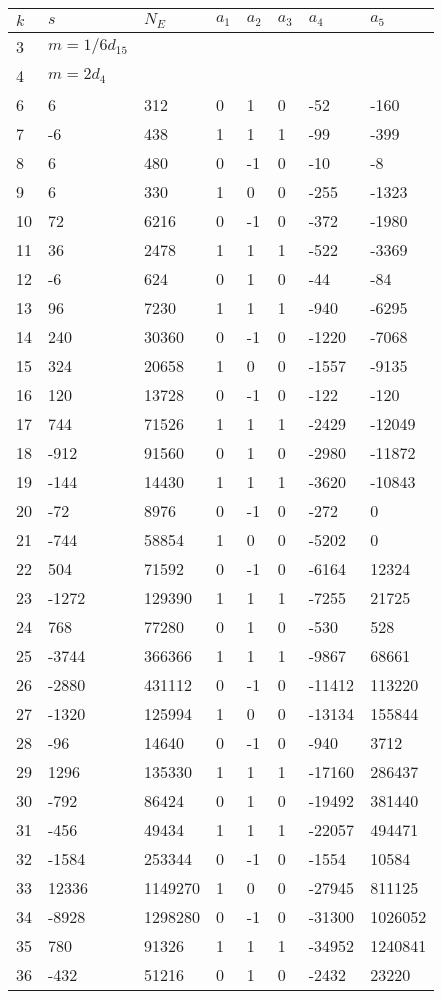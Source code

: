 \documentclass{amsart}
\begin{document}
\begin{longtable}{|l|l|l|lllll|}
\hline
$k$ & $s$ & $N_E$ & $a_1$ & $a_2$ & $a_3$ & $a_4$ & $a_5$\\
\hline
3&$m=1/6d_{15}$&&\multicolumn{5}{c|}{}\\
4&$m=2d_{4}$&&\multicolumn{5}{c|}{}\\
6&6&312&0&1&0&-52&-160\\
7&-6&438&1&1&1&-99&-399\\
8&6&480&0&-1&0&-10&-8\\
9&6&330&1&0&0&-255&-1323\\
10&72&6216&0&-1&0&-372&-1980\\
11&36&2478&1&1&1&-522&-3369\\
12&-6&624&0&1&0&-44&-84\\
13&96&7230&1&1&1&-940&-6295\\
14&240&30360&0&-1&0&-1220&-7068\\
15&324&20658&1&0&0&-1557&-9135\\
16&120&13728&0&-1&0&-122&-120\\
17&744&71526&1&1&1&-2429&-12049\\
18&-912&91560&0&1&0&-2980&-11872\\
19&-144&14430&1&1&1&-3620&-10843\\
20&-72&8976&0&-1&0&-272&0\\
21&-744&58854&1&0&0&-5202&0\\
22&504&71592&0&-1&0&-6164&12324\\
23&-1272&129390&1&1&1&-7255&21725\\
24&768&77280&0&1&0&-530&528\\
25&-3744&366366&1&1&1&-9867&68661\\
26&-2880&431112&0&-1&0&-11412&113220\\
27&-1320&125994&1&0&0&-13134&155844\\
28&-96&14640&0&-1&0&-940&3712\\
29&1296&135330&1&1&1&-17160&286437\\
30&-792&86424&0&1&0&-19492&381440\\
31&-456&49434&1&1&1&-22057&494471\\
32&-1584&253344&0&-1&0&-1554&10584\\
33&12336&1149270&1&0&0&-27945&811125\\
34&-8928&1298280&0&-1&0&-31300&1026052\\
35&780&91326&1&1&1&-34952&1240841\\
36&-432&51216&0&1&0&-2432&23220\\

\end{longtable}
\end{document}
